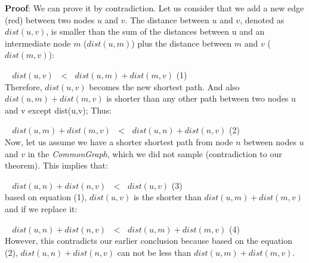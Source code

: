 \vspace{0.075in}
\noindent
\textbf{Proof}: We can prove it by contradiction. Let us consider that we add a new edge (red) between two nodes $u$ and $v$. The distance between $u$ and $v$, denoted as $dist(u,v)$, is smaller than the sum of the distances between u and an intermediate node $m$ ($dist(u,m)$) plus the distance between $m$ and $v$ ($dist(m,v)$):

\vspace{0.05in}
$\;\;$ $dist(u,v)$ $\;<\;$ $dist(u,m)+dist(m,v)$ \hspace{0.8in} (1) 
\vspace{0.05in}
\\
\noindent 
Therefore, $dist(u,v)$ becomes the new shortest path. And also $dist(u,m) + dist(m,v)$ is shorter than any other path between two nodes u and v except dist(u,v); Thus:

\vspace{0.05in}
$\;\;$ $dist(u,m)+dist(m,v)$ $\;<\;$ $dist(u,n)+dist(n,v)$ \hspace{0.15in} (2) 
\vspace{0.05in}
\\
\noindent 
Now, let us assume we have a shorter shortest path from node $n$ between nodes $u$ and $v$ in the \emph{CommonGraph}, which we did not sample (contradiction to our theorem). This implies that:

\vspace{0.05in}
$\;\;$ $dist(u,n)+dist(n,v)$ $\;<\;$ $dist(u,v)$ \hspace{0.87in} (3)
\vspace{0.05in}
\\
\noindent
based on equation (1), $dist(u,v)$ is the shorter than $dist(u,m) + dist(m,v)$ and if we replace it:

\vspace{0.05in}
$\;\;$ $dist(u,n)+dist(n,v)$ $\;<\;$ $dist(u,m)+dist(m,v)$ \hspace{0.15in} (4)
\vspace{0.05in}
\\
\noindent
However, this contradicts our earlier conclusion because based on the equation (2), $dist(u,n) + dist(n,v)$ can not be less than $dist(u,m) + dist(m,v)$.




